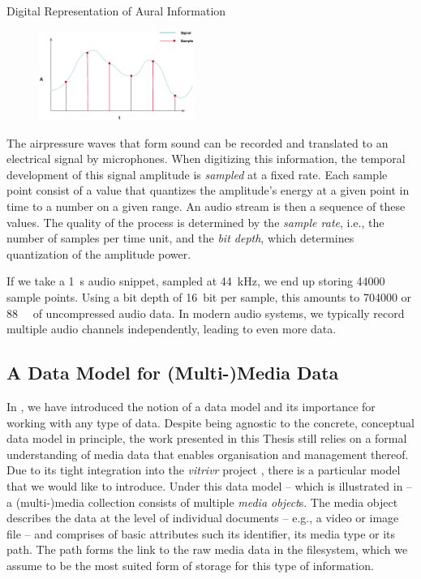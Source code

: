 \begin{example}[label=example:representation_audio_information]{Digital Representation of Aural Information}{}
    \begin{figure}
        \includegraphics[width=0.45\textwidth]{figures/example-audio-signal.eps}
    \end{figure}
    The airpressure waves that form sound can be recorded and translated to an electrical signal by microphones. When digitizing this information, the temporal development of this signal amplitude is \emph{sampled} at a fixed rate. Each sample point consist of a value that quantizes the amplitude's energy at a given point in time to a number on a given range. An audio stream is then a sequence of these values. The quality of the process is determined by the \emph{sample rate}, i.e., the number of samples per time unit, and the \emph{bit depth}, which determines quantization of the amplitude power.

    If we take a \SI{1}{\second} audio snippet, sampled at \SI{44}{\kilo\hertz}, we end up storing \num{44000} sample points. Using a bit depth of \SI{16}{bit} per sample, this amounts to \SI{704000}{\bit} or \SI{88}{\kilo\byte} of uncompressed audio data. In modern audio systems, we typically record multiple audio channels independently, leading to even more data.
\end{example}

\subsection{A Data Model for (Multi-)Media Data}
\label{section:media_data_model}
In , we have introduced the notion of a data model and its importance for working with any type of data. Despite being agnostic to the concrete, conceptual data model in principle, the work presented in this Thesis still relies on a formal understanding of media data that enables organisation and management thereof. Due to its tight integration into the \emph{vitrivr} project \cite{Rossetto:2016vitrivr,Gasser:2019Multimodal,Heller:2020Multi}, there is a particular model that we would like to introduce. Under this data model -- which is illustrated in  -- a (multi-)media collection consists of multiple \emph{media object}s. The media object describes the data at the level of individual documents -- e.g., a video or image file -- and comprises of basic attributes such its identifier, its media type or its path. The path forms the link to the raw media data in the filesystem, which we assume to be the most suited form of storage for this type of information. 

